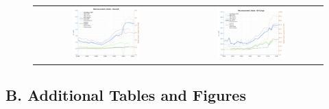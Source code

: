 \documentclass[a4paper]{article}
\begin{document}
\begin{figure}
\begin{tabular}{cc}
\includegraphics[width=0.5\textwidth, trim= {0 0 0 0}, clip]{"Figures/DataQuality_BDI.png"} & \includegraphics[width=0.5\textwidth, trim= {0 0 0 0}, clip]{"Figures/DataQuality_COD.png"} \\
\end{tabular}
\end{figure}
\FloatBarrier




\subsection*{B. Additional Tables and Figures}
\setcounter{table}{0}
\renewcommand{\thetable}{B\arabic{table}}
\setcounter{figure}{0}
\renewcommand{\thefigure}{B\arabic{figure}}
\end{document}
